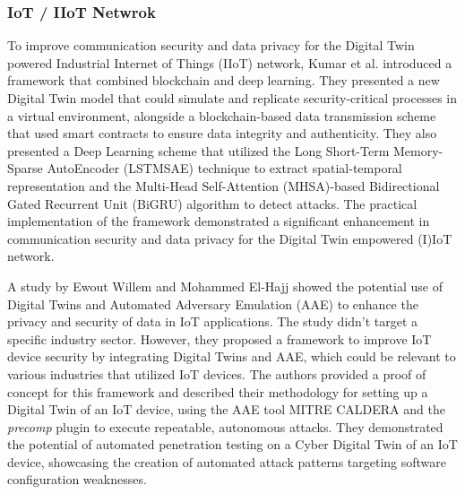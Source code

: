
\subsubsection*{IoT / IIoT Netwrok}

To improve communication security and data privacy for the Digital Twin powered Industrial Internet of Things (IIoT) network, Kumar et al. \cite{kumarBlockchainDeepLearning2022} introduced a framework that combined blockchain and deep learning. They presented a new Digital Twin model that could simulate and replicate security-critical processes in a virtual environment, alongside a blockchain-based data transmission scheme that used smart contracts to ensure data integrity and authenticity. They also presented a Deep Learning scheme that utilized the Long Short-Term Memory-Sparse AutoEncoder (LSTMSAE) technique to extract spatial-temporal representation and the Multi-Head Self-Attention (MHSA)-based Bidirectional Gated Recurrent Unit (BiGRU) algorithm to detect attacks. The practical implementation of the framework demonstrated a significant enhancement in communication security and data privacy for the Digital Twin empowered (I)IoT network.

A study by Ewout Willem and Mohammed El-Hajj \cite{vanderwalSecuringNetworksIoT2022a} showed the potential use of Digital Twins and Automated Adversary Emulation (AAE) to enhance the privacy and security of data in IoT applications. The study didn't target a specific industry sector. However, they proposed a framework to improve IoT device security by integrating Digital Twins and AAE, which could be relevant to various industries that utilized IoT devices. The authors provided a proof of concept for this framework and described their methodology for setting up a Digital Twin of an IoT device, using the AAE tool MITRE CALDERA and the \textit{precomp} plugin to execute repeatable, autonomous attacks. They demonstrated the potential of automated penetration testing on a Cyber Digital Twin of an IoT device, showcasing the creation of automated attack patterns targeting software configuration weaknesses.


